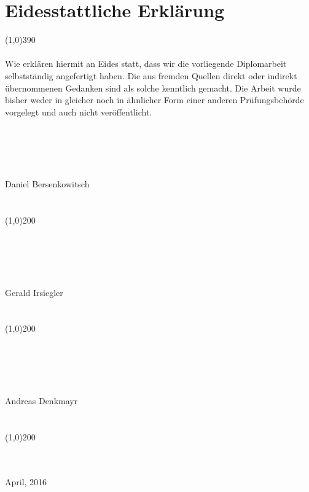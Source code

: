 \documentclass[FIPLY_base.tex]{subfiles}
\begin{document}
	\section{Eidesstattliche Erklärung}
	\line(1,0){390}
	\ \\
	\ \\
	Wie erklären hiermit an Eides statt, dass wir die vorliegende Diplomarbeit selbstständig
	angefertigt haben. Die aus fremden Quellen direkt oder indirekt übernommenen Gedanken sind als solche kenntlich gemacht. Die Arbeit wurde bisher weder in gleicher noch in ähnlicher Form einer anderen Prüfungsbehörde vorgelegt und auch nicht veröffentlicht.
	\ \\
	\ \\
	\ \\
	\ \\
	\ \\
	\ \\
	{\Large Daniel Bersenkowitsch}
	\ \\
	\ \\
	\ \\
	\line(1,0){200}
	\ \\
	\ \\
	\ \\
	\ \\
	\ \\
	\ \\
	{\Large Gerald Irsiegler}
	\ \\
	\ \\
	\ \\
	\line(1,0){200}
	\ \\
	\ \\
	\ \\
	\ \\
	\ \\
	\ \\
	{\Large Andreas Denkmayr}
	\ \\
	\ \\
	\ \\
	\line(1,0){200}
	\ \\
	\ \\
	\ \\
	\begin{flushright}
		April, 2016
	\end{flushright}
	
\end{document}
